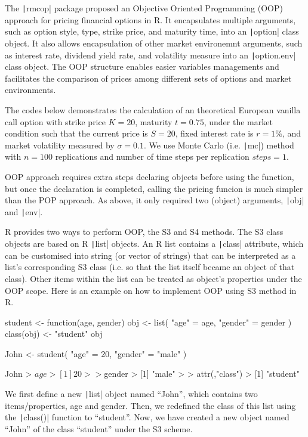 The \texttt|rmcop| package proposed an Objective Oriented Programming (OOP) approach for pricing financial options in R. It encapsulates multiple arguments, such as option style, type, strike price, and maturity time, into an \texttt|option| class object. It also allows encapsulation of other market environemnt arguments, such as interest rate, dividend yield rate, and volatility measure into an \texttt|option.env| class object. The OOP structure enables easier variables managements and facilitates the comparison of prices among different sets of options and market environments.

The codes below demonstrates the calculation of an theoretical European vanilla call option with strike price $K = 20$, maturity $t = 0.75$, under the market condition such that the current price is $S = 20$, fixed interest rate is $r = 1\%$, and market volatility measured by $\sigma = 0.1$. We use Monte Carlo (i.e. \texttt|mc|) method with $n = 100$ replications and number of time steps per replication $steps = 1$.

OOP approach requires extra steps declaring objects before using the function, but once the declaration is completed, calling the pricing funcion is much simpler than the POP approach. As above, it only required two (object) arguments, \texttt|obj| and \texttt|env|.

R provides two ways to perform OOP, the S3 and S4 methods. The S3 class objects are based on R \texttt|list| objects. An R list contains a \texttt|class| attribute, which can be customised into string (or vector of strings) that can be interpreted as a list's corresponding S3 class (i.e. so that the list itself became an object of that class). Other items within the list can be treated as object's properties under the OOP scope. Here is an example on how to implement OOP using S3 method in R.

\begin{Rminted}
student <- function(age, gender) {
    obj <- list(
        "age" = age,
        "gender" = gender
    )
    class(obj) <- "student"
    obj
}

John <- student(
    "age" = 20,
    "gender" = "male"
)

John
> $age
> [1] 20
> 
> $gender
> [1] "male"
> 
> attr(,"class")
> [1] "student"
\end{Rminted}

We first define a new \texttt|list| object named ``John'', which contains two items/properties, age and gender. Then, we redefined the class of this list using the \texttt|class()| function to ``student''. Now, we have created a new object named ``John'' of the class ``student'' under the S3 scheme.

